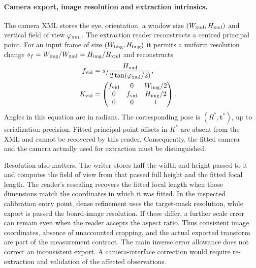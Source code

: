 \paragraph{Camera export, image resolution and extraction intrinsics.}
The camera XML stores the eye, orientation, a window size
$(W_{\rm xml},H_{\rm xml})$ and vertical field of view $\varphi_{\rm xml}$.
The extraction reader reconstructs a centred principal point. For an
input frame of size $(W_{\rm img},H_{\rm img})$ it permits a uniform resolution change
$s_f=W_{\rm img}/W_{\rm xml}=H_{\rm img}/H_{\rm xml}$ and reconstructs
\begin{equation}
\label{eq:camera-export-intrinsics}
\begin{aligned}
 f_{\rm vid}&=s_f\frac{H_{\rm xml}}{2\tan(\varphi_{\rm xml}/2)},\\
 K_{\rm vid}&=\begin{pmatrix}
 f_{\rm vid}&0&W_{\rm img}/2\\0&f_{\rm vid}&H_{\rm img}/2\\0&0&1
 \end{pmatrix}.
\end{aligned}
\end{equation}
Angles in this equation are in radians. The corresponding pose is
$(R^*,\mathbf t^*)$, up to serialization precision. Fitted principal-point
offsets in $K^*$ are absent from the XML and cannot be recovered by this
reader. Consequently, the fitted camera and the camera actually used
for extraction must be distinguished.

Resolution also matters. The writer stores half the width and height
passed to it and computes the field of view from that passed full height
and the fitted focal length. The reader's rescaling recovers the fitted
focal length when those dimensions match the coordinates in which it
was fitted. In the inspected calibration entry point, dense refinement
uses the target-mask resolution, while export is passed the board-image
resolution. If these differ, a further scale error can remain even when
the reader accepts the aspect ratio. Thus consistent image coordinates,
absence of unaccounted cropping, and the actual exported transform are
part of the measurement contract. The main inverse error allowance does
not correct an inconsistent export. A camera-interface correction would
require re-extraction and validation of the affected observations.

